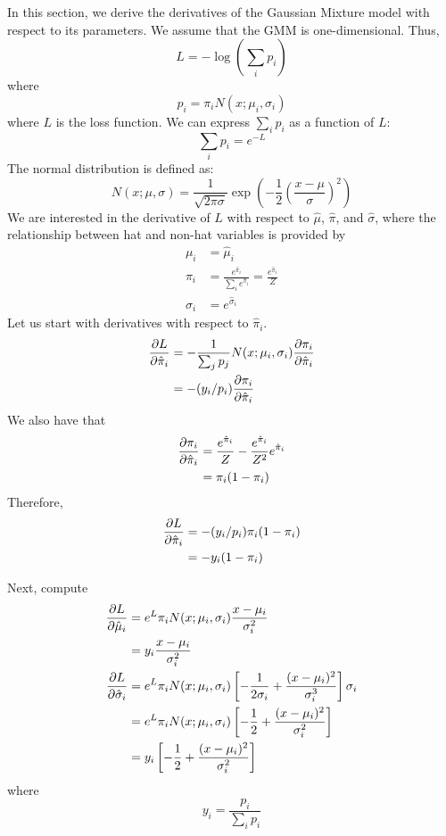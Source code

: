 \documentclass[11pt]{article}
\def\muhat{\hat{\mu}}
\def\pihat{\hat{\pi}}
\def\sighat{\hat{\sigma}}
\begin{document}
In this section, we derive the derivatives of the Gaussian Mixture model with respect to 
its parameters. We assume that the GMM is one-dimensional. Thus, 
$$
L = -\log({\sum_i p_i})
$$
where 
$$
p_i = \pi_i N(x;\mu_i, \sigma_i)
$$
where $L$ is the loss function. We can express $\sum_i p_i$ as a function of $L$: 
$$
\sum_i p_i = e^{-L}
$$
The normal distribution is defined as: 
$$
N(x;\mu,\sigma) = \frac{1}{\sqrt{2\pi\sigma}} \exp\left(-\frac12 \left(\frac{x-\mu}{\sigma}\right)^2\right)
$$
We are interested in the derivative of $L$ with respect to $\muhat$, $\pihat$, and $\sighat$, 
where the relationship between hat and non-hat variables is provided by 
\begin{align}
\mu_i &= \muhat_i \\
\pi_i &= \frac{e^{\pihat_i}}{\sum_i e^{\pihat_i}} = \frac{e^{\pihat_i}}{Z} \\
\sigma_i &= e^{\sighat_i}
\end{align}
Let us start with derivatives with respect to $\pihat_i$. 
\begin{align}
\pf{L}{\pihat_i} &= -\frac{1}{\sum_j p_j} N(x;\mu_i, \sigma_i) \pf{\pi_i}{\pihat_i}  \\
                 &= -(y_i/p_i) \pf{\pi_i}{\pihat_i}  \\
\end{align}
We also have that
\begin{align}
\pf{\pi_i}{\pihat_i} &= \frac{e^{\pihat_i}}{Z} - \frac{e^{\pihat_i}}{Z^2} e^{\pihat_i} \\
  &= \pi_i ( 1 - \pi_i)
\end{align}
Therefore, 
\begin{align}
\pf{L}{\pihat_i} &= - (y_i/p_i) \pi_i (1-\pi_i)  \\
          &= - y_i (1-\pi_i)
\end{align}

Next, compute
\begin{align}
\pf{L}{\muhat_i} &= e^{L} \pi_i N(x; \mu_i, \sigma_i) \frac{x-\mu_i}{\sigma_i^2} \\
                 &= y_i  \frac{x-\mu_i}{\sigma_i^2} \\
\pf{L}{\sighat_i} &= e^{L} \pi_i N(x; \mu_i, \sigma_i) \left[ -\frac{1}{2\sigma_i} + \frac{(x-\mu_i)^2}{\sigma_i^3}\right] \sigma_i \\
                 &= e^{L} \pi_i N(x; \mu_i, \sigma_i) \left[-\frac12 + \frac{(x-\mu_i)^2}{\sigma_i^2} \right] \\
				 &= y_i \left[-\frac{1}{2} + \frac{(x-\mu_i)^2}{\sigma_i^2} \right] 
\end{align}
where 
$$
y_i = \frac{p_i}{\sum_i p_i}
$$
\end{document}
